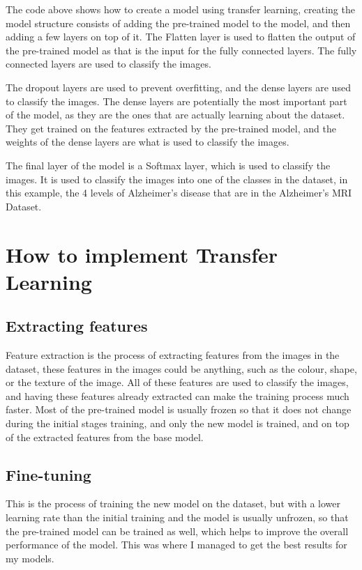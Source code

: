 \documentclass[]{final_report}
\begin{document}
The code above shows how to create a model using transfer learning,
creating the model structure consists of adding the pre-trained model to the model, 
and then adding a few layers on top of it. The Flatten layer is used to flatten the output of the pre-trained model
as that is the input for the fully connected layers. The fully connected layers are used to classify the images.

The dropout layers are used to prevent overfitting, and the dense layers are used to classify the images.
The dense layers are potentially the most important part of the model, as they are the ones that are actually learning about the dataset.
They get trained on the features extracted by the pre-trained model, and the weights of the dense layers are what is used to classify the images.

The final layer of the model is a Softmax layer, which is used to classify the images.
It is used to classify the images into one of the classes in the dataset, in this example,
the 4 levels of Alzheimer's disease that are in the Alzheimer's MRI Dataset.

\pagebreak
\section{How to implement Transfer Learning}

\subsection{Extracting features}
Feature extraction is the process of extracting features from the images in the dataset, these features
in the images could be anything, such as the colour, shape, or the texture of the image. All of these features
are used to classify the images, and having these features already extracted can make the training process much faster.
Most of the pre-trained model is usually frozen so that it does not change during the initial stages training, and only the new model is trained,
and on top of the extracted features from the base model.

\subsection{Fine-tuning}
This is the process of training the new model on the dataset, but with a lower learning rate than the initial training and the model is usually unfrozen,
so that the pre-trained model can be trained as well, which helps to improve the overall performance of the model.
This was where I managed to get the best results for my models.
\end{document}
